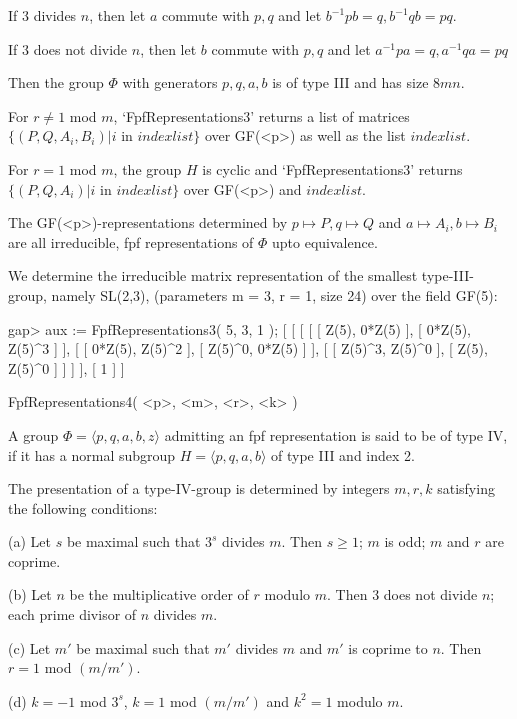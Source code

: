  If $3$ divides $n$, then let $a$ commute with $p,q$ and let
 $b^{-1}pb = q, b^{-1}qb = pq$.

 If $3$ does not divide $n$, then let $b$ commute with $p,q$ and let
 $a^{-1}pa = q, a^{-1}qa = pq$

 Then the group $\Phi$ with generators $p,q,a,b$ is of type III and
 has size $8mn$. 

For $r \neq 1$ mod $m$, `FpfRepresentations3' returns a list of matrices 
$\{ (P, Q, A_i,B_i) | i$ in $indexlist \}$ over GF(<p>) as well as the list
$indexlist$.

For $r = 1$ mod $m$, the group $H$ is cyclic and `FpfRepresentations3' returns
$\{ (P, Q, A_i) | i$ in $indexlist \}$ over GF(<p>) and $indexlist$.

The GF(<p>)-representations
determined by $p \mapsto P, q \mapsto Q$ and $a \mapsto A_i, b \mapsto B_i$
are all irreducible, fpf representations of $\Phi$ upto equivalence.

We determine the irreducible matrix representation of the smallest
type-III-group, namely SL(2,3), (parameters m = 3, r = 1, size 24) over the
field GF(5): 

\beginexample
    gap> aux := FpfRepresentations3( 5, 3, 1 );
    [ [ [ [ [ Z(5), 0*Z(5) ], [ 0*Z(5), Z(5)^3 ] ], 
              [ [ 0*Z(5), Z(5)^2 ], [ Z(5)^0, 0*Z(5) ] ], 
              [ [ Z(5)^3, Z(5)^0 ], [ Z(5), Z(5)^0 ] ] ] ], [ 1 ] ]
\endexample

\>FpfRepresentations4( <p>, <m>, <r>, <k> )

 A group $\Phi = \langle p,q,a,b,z\rangle$ admitting an fpf
 representation is said to be of type IV, if it has a normal subgroup
 $H = \langle p,q,a,b\rangle$ of type III and index 2.

 The presentation of a type-IV-group is determined by integers $m,r,k$
 satisfying the following conditions:

\beginlist
\item{(a)} Let $s$ be maximal such that $3^s$ divides $m$. Then
 $s\geq 1$; $m$ is odd; $m$ and $r$ are coprime.
\item{(b)} Let $n$ be the multiplicative order of $r$ modulo $m$.
 Then $3$ does not divide $n$; each prime divisor of $n$ divides $m$.
\item{(c)} Let $m'$ be maximal such that $m'$ divides $m$ and $m'$ is coprime
 to $n$. Then $r = 1$ mod $(m/m')$.
\item{(d)} $k = -1$ mod $3^s$, $k = 1$ mod $(m/m')$ and $k^2 = 1$ modulo $m$.
\endlist

